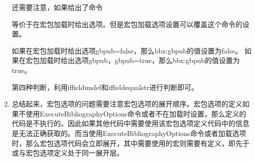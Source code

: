 \begin{enumerate}
        还需要注意，如果给出了命令
        \begin{texlist}
        \end{texlist}
        等价于在宏包加载时给出选项。但是宏包加载选项设置可以覆盖这个命令的设置。

        如果在宏包加载时给出选项gbpub=false，那么bbx:gbpub的值设置为false。
        如果在宏包加载时给出选项gbpub，gbpub=true，那么bbx:gbpub的值设置为true。

        第四种判断，利用iffieldundef和iffieldequalstr进行判断即可。

    \item 总结起来，宏包选项的问题需要注意宏包选项的展开顺序。宏包选项的定义如果不使用ExecuteBibliographyOptions命令或者不在加载时设置，那么定义的代码是不执行的。因此如果其他代码中需要使用该宏包选项定义代码中的信息是无法正确获取的。而当使用ExecuteBibliographyOptions命令或者加载选项时，那么宏包选项代码会立即展开，其中需要使用的宏则需要有定义，即先于或与宏包选项定义处于同一展开层。


  \end{enumerate}


